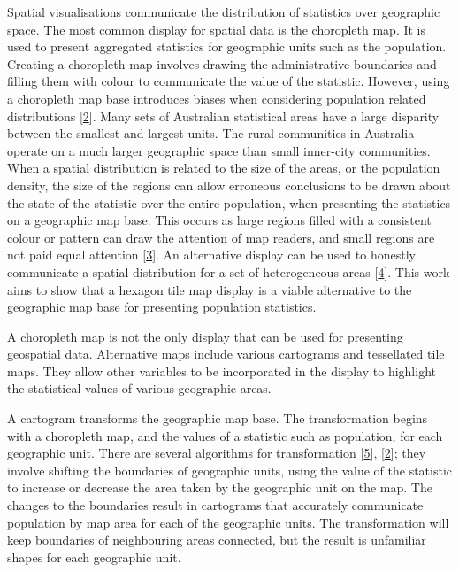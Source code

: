 \documentclass[conference,final,]{IEEEtran}
\begin{document}
Spatial visualisations communicate the distribution of statistics over geographic space. The most common display for spatial data is the choropleth map. It is used to present aggregated statistics for geographic units such as the population. Creating a choropleth map involves drawing the administrative boundaries and filling them with colour to communicate the value of the statistic. However, using a choropleth map base introduces biases when considering population related distributions {[}\protect\hyperlink{ref-CBATCC}{2}{]}.
Many sets of Australian statistical areas have a large disparity between the smallest and largest units.
The rural communities in Australia operate on a much larger geographic space than small inner-city communities. When a spatial distribution is related to the size of the areas, or the population density, the size of the regions can allow erroneous conclusions to be drawn about the state of the statistic over the entire population, when presenting the statistics on a geographic map base. This occurs as large regions filled with a consistent colour or pattern can draw the attention of map readers, and small regions are not paid equal attention {[}\protect\hyperlink{ref-CTTMB}{3}{]}. An alternative display can be used to honestly communicate a spatial distribution for a set of heterogeneous areas {[}\protect\hyperlink{ref-NISCC}{4}{]}.
This work aims to show that a hexagon tile map display is a viable alternative to the geographic map base for presenting population statistics.

A choropleth map is not the only display that can be used for presenting geospatial data.
Alternative maps include various cartograms and tessellated tile maps. They allow other variables to be incorporated in the display to highlight the statistical values of various geographic areas.

A cartogram transforms the geographic map base. The transformation begins with a choropleth map, and the values of a statistic such as population, for each geographic unit. There are several algorithms for transformation {[}\protect\hyperlink{ref-ACTUC}{5}{]}, {[}\protect\hyperlink{ref-CBATCC}{2}{]}; they involve shifting the boundaries of geographic units, using the value of the statistic to increase or decrease the area taken by the geographic unit on the map.
The changes to the boundaries result in cartograms that accurately communicate population by map area for each of the geographic units. The transformation will keep boundaries of neighbouring areas connected, but the result is unfamiliar shapes for each geographic unit.
\end{document}
